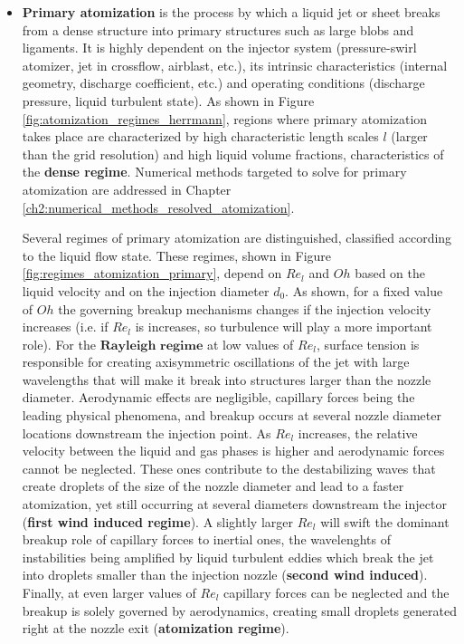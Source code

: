 \begin{itemize}

	\item \textbf{Primary atomization} is the process by which a liquid jet or sheet breaks from a dense structure into primary structures such as large blobs and ligaments. It is highly dependent on the injector system (pressure-swirl atomizer, jet in crossflow, airblast, etc.), its intrinsic characteristics (internal geometry, discharge coefficient, etc.) and operating conditions (discharge pressure, liquid turbulent state). As shown in Figure \ref{fig:atomization_regimes_herrmann}, regions where primary atomization takes place are characterized by high characteristic length scales $l$ (larger than the grid resolution) and high liquid volume fractions, characteristics of the \textbf{dense regime}. Numerical methods targeted to solve for primary atomization are addressed in Chapter \ref{ch2:numerical_methods_resolved_atomization}. 
	
	Several regimes of primary atomization are distinguished, classified according to the liquid flow state. These regimes, shown in Figure \ref{fig:regimes_atomization_primary}, depend on $Re_l$ and $Oh$ based on the liquid velocity and on the injection diameter $d_0$. As shown, for a fixed value of $Oh$ the governing breakup mechanisms changes if the injection velocity increases (i.e. if $Re_l$ is increases, so turbulence will play a more important role). For the $\textbf{Rayleigh regime}$ at low values of $Re_l$, surface tension is responsible for creating axisymmetric oscillations of the jet with large wavelengths that will make it break into structures larger than the nozzle diameter. Aerodynamic effects are negligible, capillary forces being the leading physical phenomena, and breakup occurs at several nozzle diameter locations downstream the injection point. As $Re_l$ increases, the relative velocity between the liquid and gas phases is higher and aerodynamic forces cannot be neglected. These ones contribute to the destabilizing waves that create droplets of the size of the nozzle diameter and lead to a faster atomization, yet still occurring at several diameters downstream the injector (\textbf{first wind induced regime}). A slightly larger $Re_l$ will swift the dominant breakup role of capillary forces to inertial ones, the wavelenghts of instabilities being amplified by liquid turbulent eddies which break the jet into droplets smaller than the injection nozzle (\textbf{second wind induced}). Finally, at even larger values of $Re_l$ capillary forces can be neglected and the breakup is solely governed by aerodynamics, creating small droplets generated right at the nozzle exit (\textbf{atomization regime}).


\end{itemize}
